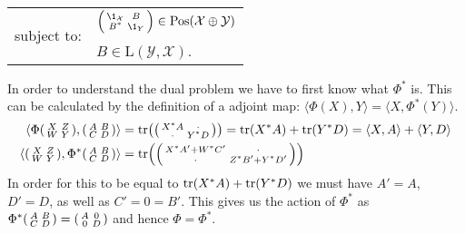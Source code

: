\documentclass[boxes,pages,color=SeaGreen]{homework}
\newcommand{\X}{\mathcal{X}}
\newcommand{\Y}{\mathcal{Y}}
\newcommand{\Lin}{\mathrm{L}}
\newcommand{\Pos}{\mathrm{Pos}}
\begin{document}
\begin{solution}
\begin{center}
\begin{tabular}{rl}
            \multirow{2}{*}{subject to:}     & $\smqty(\1_\X                                                         & B \\ B^* & \1_Y) \in \Pos(\X\oplus\Y)$                         \\
                                             & $B\in\Lin(\Y, \X)$.
        \end{tabular}
    \end{center}
    In order to understand the dual problem we have to first know what $\Phi^*$ is.
    This can be calculated by the definition of a adjoint map: $\langle\Phi(X), Y\rangle = \langle X, \Phi^*(Y)\rangle$.
    \begin{align*}
        \langle\Phi\smqty(X & Z \\ W & Y), \smqty(A & B \\ C & D)\rangle & = \tr(\smqty(X^*A & \cdot \\ \cdot & Y^*D)) = \tr(X^*A) + \tr(Y^*D) = \langle X, A\rangle + \langle Y , D \rangle \\
        \langle\smqty(X     & Z \\ W & Y), \Phi^*\smqty(A & B \\ C & D)\rangle & = \tr(\smqty(X^*A' + W^*C' & \cdot \\ \cdot & Z^*B' + Y^*D'))
    \end{align*}
    In order for this to be equal to $\tr(X^*A) + \tr(Y^*D)$ we must have $A' = A$, $D' = D$, as well as $C' = 0 = B'$.
    This gives us the action of $\Phi^*$ as $\Phi^*\smqty(A & B \\ C & D) = \smqty(A & 0 \\ 0 & D)$ and hence $\Phi = \Phi^*$.


\end{solution}
\end{document}
